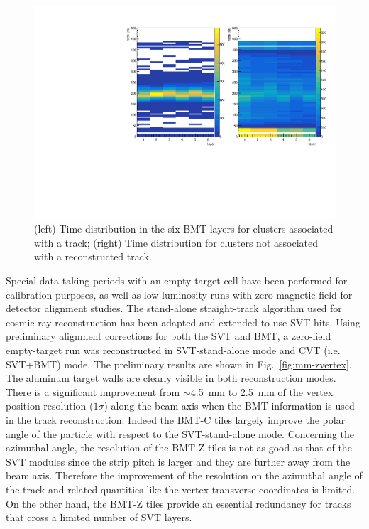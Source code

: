 \begin{figure}[htb]
 \includegraphics[width=\columnwidth,keepaspectratio]{images/align_cls_time.pdf}
 \caption{(left) Time distribution in the six BMT layers for clusters associated with a track; (right) Time distribution for clusters
   not associated with a reconstructed track.}
 \label{fig:mm-beam_cls_time}
\end{figure}

Special data taking periods with an empty target cell have been performed for calibration purposes, as well as low luminosity runs
with zero magnetic field for detector alignment studies. The stand-alone straight-track algorithm used for cosmic ray
reconstruction has been adapted and extended to use SVT hits. Using preliminary alignment corrections for both the SVT and
BMT, a zero-field empty-target run was reconstructed in SVT-stand-alone mode and CVT (i.e. SVT$+$BMT) mode. The 
preliminary results are shown in Fig.~\ref{fig:mm-zvertex}. The aluminum target walls are clearly visible in both 
reconstruction modes. There is a significant improvement from $\sim$4.5~mm to 2.5~mm of the 
vertex position resolution ($1\sigma$) along the beam axis when the BMT information is used in the track reconstruction. Indeed the BMT-C tiles 
largely improve the polar angle of the particle with respect to the SVT-stand-alone mode. Concerning the azimuthal 
angle, the resolution of the BMT-Z tiles is not as good as that of the SVT modules since the strip pitch is larger and they are further away from the beam 
axis. Therefore the improvement of the resolution on the azimuthal angle of the track and related quantities like the 
vertex transverse coordinates is limited. On the other hand, the BMT-Z tiles provide an essential redundancy for tracks that 
cross a limited number of SVT layers.

